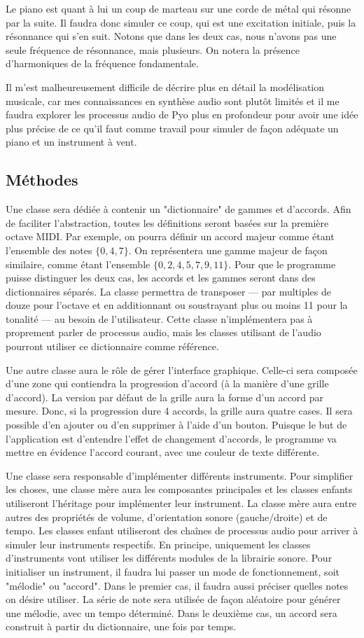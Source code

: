 \documentclass[letterpaper,12pt]{scrartcl}
\begin{document}
	 Le piano est quant à lui un coup de marteau sur une corde de métal qui résonne par la suite. Il faudra donc simuler ce coup, qui est une excitation initiale, puis la résonnance qui s'en suit. Notons que dans les deux cas, nous n'avons pas une seule fréquence de résonnance, mais plusieurs. On notera la présence d'harmoniques de la fréquence fondamentale.
	
	
	Il m'est malheureusement difficile de décrire plus en détail la modélisation musicale, car mes connaissances en synthèse audio sont plutôt limités et il me faudra explorer les processus audio de Pyo plus en profondeur pour avoir une idée plus précise de ce qu'il faut comme travail pour simuler de façon adéquate un piano et un instrument à vent.

	\subsection{Méthodes}
	Une classe sera dédiée à contenir un "dictionnaire" de gammes et d'accords. Afin de faciliter l'abstraction, toutes les définitions seront basées sur la première octave MIDI. Par exemple, on pourra définir un accord majeur comme étant l'ensemble des notes $\{0,4,7\}$. On représentera une gamme majeur de façon similaire, comme étant l'ensemble $\{0,2,4,5,7,9,11\}$. Pour que le programme puisse distinguer les deux cas, les accords et les gammes seront dans des dictionnaires séparés. La classe permettra de transposer --- par multiples de douze pour l'octave et en additionnant ou soustrayant plus ou moins 11 pour la tonalité --- au besoin de l'utilisateur. Cette classe n'implémentera pas à proprement parler de processus audio, mais les classes utilisant de l'audio pourront utiliser ce dictionnaire comme référence. 
	
	Une autre classe aura le rôle de gérer l'interface graphique. Celle-ci sera composée d'une zone qui contiendra la progression d'accord (à la manière d'une grille d'accord). La version par défaut de la grille aura la forme d'un accord par mesure. Donc, si la progression dure 4 accords, la grille aura quatre cases. Il sera possible d'en ajouter ou d'en supprimer à l'aide d'un bouton. Puisque le but de l'application est d'entendre l'effet de changement d'accords, le programme va mettre en évidence l'accord courant, avec une couleur de texte différente.
	
	Une classe sera responsable d'implémenter différents instruments. Pour simplifier les choses, une classe mère aura les composantes principales et les classes enfants utiliseront l'héritage pour implémenter leur instrument. La classe mère aura entre autres des propriétés de volume, d'orientation sonore (gauche/droite) et de tempo. Les classes enfant utiliseront des chaînes de processus audio pour arriver à simuler leur instruments respectifs. En principe, uniquement les classes d'instruments vont utiliser les différents modules de la librairie sonore. Pour initialiser un instrument, il faudra lui passer un mode de fonctionnement, soit "mélodie" ou "accord". Dans le premier cas, il faudra aussi préciser quelles notes on désire utiliser. La série de note sera utilisée de façon aléatoire pour générer une mélodie, avec un tempo déterminé. Dans le deuxième cas, un accord sera construit à partir du dictionnaire, une fois par temps. 
\end{document}
